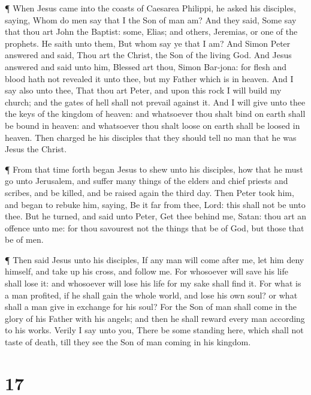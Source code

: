  ¶ When Jesus came into the coasts of Caesarea Philippi, he
asked his disciples, saying, Whom do men say that I the Son of man am?
 And they said, Some say that thou art John the Baptist:
some, Elias; and others, Jeremias, or one of the prophets. 
He saith unto them, But whom say ye that I am?  And Simon
Peter answered and said, Thou art the Christ, the Son of the living God.
 And Jesus answered and said unto him, Blessed art thou,
Simon Bar-jona: for flesh and blood hath not revealed it unto thee, but
my Father which is in heaven.  And I say also unto thee,
That thou art Peter, and upon this rock I will build my church; and the
gates of hell shall not prevail against it.  And I will
give unto thee the keys of the kingdom of heaven: and whatsoever thou
shalt bind on earth shall be bound in heaven: and whatsoever thou shalt
loose on earth shall be loosed in heaven.  Then charged he
his disciples that they should tell no man that he was Jesus the Christ.

 ¶ From that time forth began Jesus to shew unto his
disciples, how that he must go unto Jerusalem, and suffer many things of
the elders and chief priests and scribes, and be killed, and be raised
again the third day.  Then Peter took him, and began to
rebuke him, saying, Be it far from thee, Lord: this shall not be unto
thee.  But he turned, and said unto Peter, Get thee behind
me, Satan: thou art an offence unto me: for thou savourest not the
things that be of God, but those that be of men.

 ¶ Then said Jesus unto his disciples, If any man will come
after me, let him deny himself, and take up his cross, and follow me.
 For whosoever will save his life shall lose it: and
whosoever will lose his life for my sake shall find it. 
For what is a man profited, if he shall gain the whole world, and lose
his own soul? or what shall a man give in exchange for his soul?
 For the Son of man shall come in the glory of his Father
with his angels; and then he shall reward every man according to his
works.  Verily I say unto you, There be some standing here,
which shall not taste of death, till they see the Son of man coming in
his kingdom.

\hypertarget{section-16}{%
\section{17}\label{section-16}}

